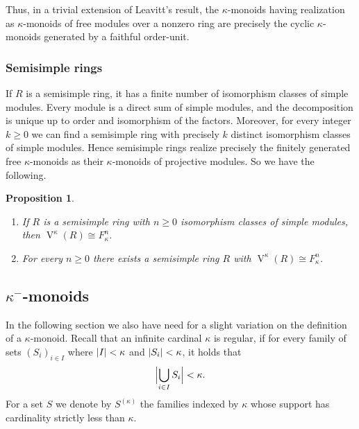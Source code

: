 \documentclass[a4paper,11pt,oneside]{amsart}
\newtheorem{prop}[teor]{Proposition}
\theoremstyle{remark}
\DeclarePairedDelimiter{\card}{\lvert}{\rvert}
\newcommand{\defit}[1]{\textsf{#1}}
\DeclareMathOperator{\Vmon}{V}
\begin{document}
Thus, in a trivial extension of Leavitt's result, the $\kappa$-monoids having realization as $\kappa$-monoids of free modules over a nonzero ring are precisely the cyclic $\kappa$-monoids generated by a faithful order-unit.

\subsubsection{Semisimple rings}

If $R$ is a semisimple ring, it has a finite number of isomorphism classes of simple modules.
Every module is a direct sum of simple modules, and the decomposition is unique up to order and isomorphism of the factors.
Moreover, for every integer $k \ge 0$ we can find a semisimple ring with precisely $k$ distinct isomorphism classes of simple modules.
Hence semisimple rings realize precisely the finitely generated free $\kappa$-monoids as their $\kappa$-monoids of projective modules. So we have the following.

\begin{prop}
  \mbox{}
  \begin{enumerate}
  \item If $R$ is a semisimple ring with $n \ge 0$ isomorphism classes of simple modules, then $\Vmon^{\kappa}(R) \cong F_\kappa^n$.
  \item For every $n \ge 0$ there exists a semisimple ring $R$ with $\Vmon^{\kappa}(R) \cong F_\kappa^n$.
  \end{enumerate}
\end{prop}

\subsection{\texorpdfstring{$\kappa^-$}{κ}-monoids} \label{subsec:kappaminus-monoids}

In the following section we also have need for a slight variation on the definition of a $\kappa$-monoid.
Recall that an infinite cardinal $\kappa$ is \defit{regular}, if for every family of sets $(S_i)_{i \in I}$ where $\card{I} < \kappa$ and $\card{S_i} < \kappa$, it holds that
\[
  \card[\Big]{\bigcup_{i\in I}S_i} < \kappa.
\]
For a set $S$ we denote by $S^{(\kappa)}$ the families indexed by $\kappa$ whose support has cardinality strictly less than $\kappa$.
\end{document}
